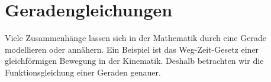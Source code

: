 \section{Geradengleichungen}
\label{sec:real_functions_affine_functions}
Viele Zusammenhänge lassen sich in der Mathematik durch eine Gerade
modellieren oder annähern. Ein Beispiel ist das Weg-Zeit-Gesetz einer
gleichförmigen Bewegung in der Kinematik. Deshalb betrachten wir die
Funktionsgleichung einer Geraden genauer.

